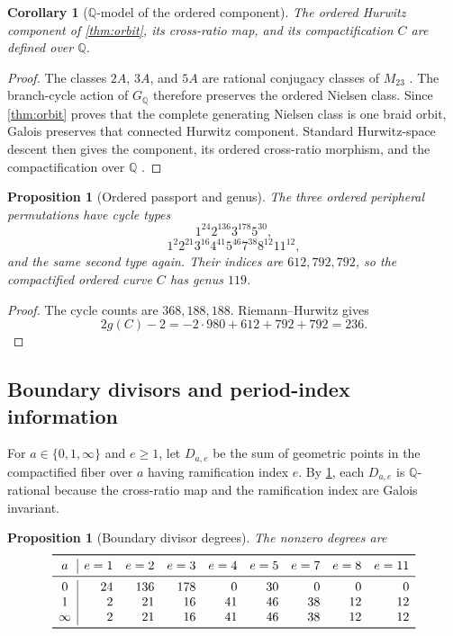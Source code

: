 \documentclass[11pt]{article}
\newtheorem{proposition}[theorem]{Proposition}
\newtheorem{corollary}[theorem]{Corollary}
\theoremstyle{remark}
\newcommand{\Q}{\mathbb Q}
\begin{document}
\begin{corollary}[$\Q$-model of the ordered component]\label{cor:q-model}
The ordered Hurwitz component of \cref{thm:orbit}, its cross-ratio map, and its compactification $C$ are defined over $\Q$.
\end{corollary}

\begin{proof}
The classes $2A$, $3A$, and $5A$ are rational conjugacy classes of $M_{23}$ \cite{Atlas}.  The branch-cycle action of $G_{\Q}$ therefore preserves the ordered Nielsen class.  Since \cref{thm:orbit} proves that the complete generating Nielsen class is one braid orbit, Galois preserves that connected Hurwitz component.  Standard Hurwitz-space descent then gives the component, its ordered cross-ratio morphism, and the compactification over $\Q$ \cite{FriedVolklein}.
\end{proof}

\begin{proposition}[Ordered passport and genus]\label{prop:genus119}
The three ordered peripheral permutations have cycle types
\[
 1^{24}2^{136}3^{178}5^{30},
\]
\[
 1^{2}2^{21}3^{16}4^{41}5^{46}7^{38}8^{12}11^{12},
\]
and the same second type again.  Their indices are $612,792,792$, so the compactified ordered curve $C$ has genus $119$.
\end{proposition}

\begin{proof}
The cycle counts are $368,188,188$.  Riemann--Hurwitz gives
\[
 2g(C)-2=-2\cdot980+612+792+792=236.
\]
\end{proof}

\subsection{Boundary divisors and period-index information}

For $a\in\{0,1,\infty\}$ and $e\geq1$, let $D_{a,e}$ be the sum of geometric points in the compactified fiber over $a$ having ramification index $e$.  By \cref{cor:q-model}, each $D_{a,e}$ is $\Q$-rational because the cross-ratio map and the ramification index are Galois invariant.

\begin{proposition}[Boundary divisor degrees]\label{prop:boundary-table}
The nonzero degrees are
\[
\begin{array}{c|rrrrrrrr}
\toprule
 a & e=1&e=2&e=3&e=4&e=5&e=7&e=8&e=11\\
\midrule
 0       &24&136&178&0 &30&0 &0 &0\\
 1       & 2& 21& 16&41&46&38&12&12\\
 \infty  & 2& 21& 16&41&46&38&12&12\\
\bottomrule
\end{array}
\]
\end{proposition}
\end{document}
